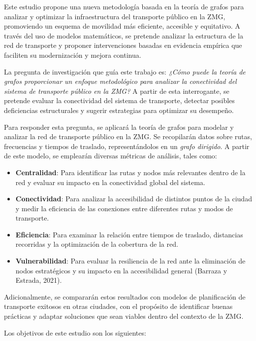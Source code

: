 \documentclass[openany]{book}
\begin{document}
Este estudio propone una nueva metodología basada en la teoría de grafos para analizar y optimizar la infraestructura del transporte público en la ZMG, promoviendo un esquema de movilidad más eficiente, accesible y equitativo. A través del uso de modelos matemáticos, se pretende analizar la estructura de la red de transporte y proponer intervenciones basadas en evidencia empírica que faciliten su modernización y mejora continua.

La pregunta de investigación que guía este trabajo es: \textit{¿Cómo puede la teoría de grafos proporcionar un enfoque metodológico para analizar la conectividad del sistema de transporte público en la ZMG?} A partir de esta interrogante, se pretende evaluar la conectividad del sistema de transporte, detectar posibles deficiencias estructurales y sugerir estrategias para optimizar su desempeño.

Para responder esta pregunta, se aplicará la teoría de grafos para modelar y analizar la red de transporte público en la ZMG. Se recopilarán datos sobre rutas, frecuencias y tiempos de traslado, representándolos en un \textit{grafo dirigido}. A partir de este modelo, se emplearán diversas métricas de análisis, tales como:

\begin{itemize}
	\item \textbf{Centralidad}: Para identificar las rutas y nodos más relevantes dentro de la red y evaluar su impacto en la conectividad global del sistema.
	\item \textbf{Conectividad}: Para analizar la accesibilidad de distintos puntos de la ciudad y medir la eficiencia de las conexiones entre diferentes rutas y modos de transporte.
	\item \textbf{Eficiencia}: Para examinar la relación entre tiempos de traslado, distancias recorridas y la optimización de la cobertura de la red.
	\item \textbf{Vulnerabilidad}: Para evaluar la resiliencia de la red ante la eliminación de nodos estratégicos y su impacto en la accesibilidad general (Barraza y Estrada, 2021).
\end{itemize}

Adicionalmente, se compararán estos resultados con modelos de planificación de transporte exitosos en otras ciudades, con el propósito de identificar buenas prácticas y adaptar soluciones que sean viables dentro del contexto de la ZMG.

Los objetivos de este estudio son los siguientes:
\end{document}
